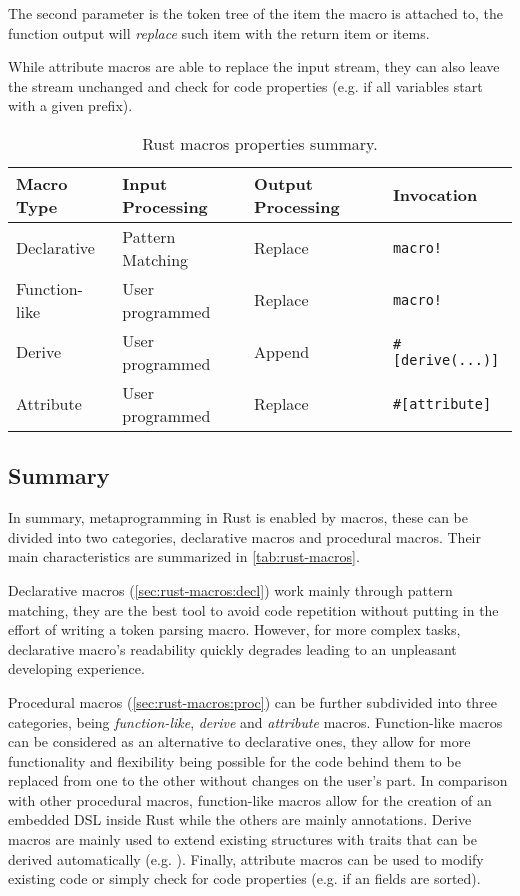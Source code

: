 The second parameter is the token tree of the item the macro is attached to,
the function output will \emph{replace} such item with the return item or items.

While attribute macros are able to replace the input stream,
they can also leave the stream unchanged and check for code properties (e.g. if all variables start with a given prefix).



\begin{table}
	\centering
	\begin{tabular}{l|l|l|l}
		Macro Type    & Input Processing & Output Processing & Invocation                 \\
		\hline
		Declarative   & Pattern Matching & Replace           & \texttt{macro!}            \\
		Function-like & User programmed  & Replace           & \texttt{macro!}            \\
		Derive        & User programmed  & Append            & \texttt{\#{[}derive(...)]} \\
		Attribute     & User programmed  & Replace           & \texttt{\#{[}attribute]}
	\end{tabular}
	\caption{Rust macros properties summary.}
	\label{tab:rust-macros}
\end{table}

\subsection{Summary}
In summary, metaprogramming in Rust is enabled by macros, these can be divided into two categories,
declarative macros and procedural macros.
Their main characteristics are summarized in \autoref{tab:rust-macros}.

Declarative macros (\autoref{sec:rust-macros:decl}) work mainly through pattern matching,
they are the best tool to avoid code repetition without putting in the effort of writing a token parsing macro.
However, for more complex tasks, declarative macro's readability quickly degrades leading to an unpleasant developing experience.

Procedural macros (\autoref{sec:rust-macros:proc}) can be further subdivided into three categories,
being \emph{function-like}, \emph{derive} and \emph{attribute} macros.
Function-like macros can be considered as an alternative to declarative ones,
they allow for more functionality and flexibility being possible for the code behind them
to be replaced from one to the other without changes on the user's part.
In comparison with other procedural macros, function-like macros allow for the creation of an embedded DSL inside Rust while the others are mainly annotations.
Derive macros are mainly used to extend existing structures with traits that can be derived automatically (e.g. ).
Finally, attribute macros can be used to modify existing code or simply check for code properties (e.g. if an  fields are sorted).

